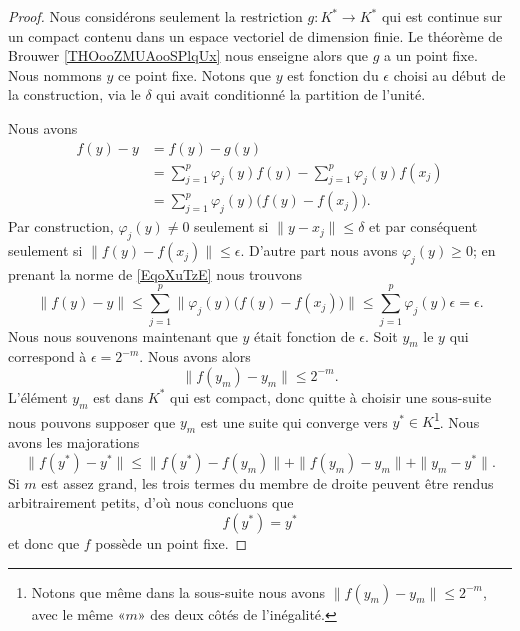 \begin{proof}
	Nous considérons seulement la restriction \( g\colon K^*\to K^*\) qui est continue sur un compact contenu dans un espace vectoriel de dimension finie. Le théorème de Brouwer \ref{THOooZMUAooSPlqUx} nous enseigne alors que \( g\) a un point fixe. Nous nommons \( y\) ce point fixe. Notons que \( y\) est fonction du \( \epsilon\) choisi au début de la construction, via le \( \delta\) qui avait conditionné la partition de l'unité.

	Nous avons
	\begin{subequations}        \label{EqoXuTzE}
		\begin{align}
			f(y)-y & =f(y)-g(y)                                                   \\
			       & =\sum_{j=1}^p\varphi_j(y)f(y)-\sum_{j=1}^p\varphi_j(y)f(x_j) \\
			       & =\sum_{j=1}^p\varphi_j(y)\big( f(y)-f(x_j) \big).
		\end{align}
	\end{subequations}
	Par construction, \( \varphi_j(y)\neq 0\) seulement si \( \| y-x_j \|\leq \delta\) et par conséquent seulement si \( \| f(y)-f(x_j) \|\leq \epsilon\). D'autre part nous avons \( \varphi_j(y)\geq 0\); en prenant la norme de \eqref{EqoXuTzE} nous trouvons
	\begin{equation}
		\| f(y)-y \|\leq \sum_{j=1}^p\| \varphi_j(y)\big( f(y)-f(x_j) \big) \|\leq \sum_{j=1}^p\varphi_j(y)\epsilon=\epsilon.
	\end{equation}
	Nous nous souvenons maintenant que \( y\) était fonction de \( \epsilon\). Soit \( y_m\) le \( y\) qui correspond à \( \epsilon=2^{-m}\). Nous avons alors
	\begin{equation}
		\| f(y_m)-y_m \|\leq 2^{-m}.
	\end{equation}
	L'élément \( y_m\) est dans \( K^*\) qui est compact, donc quitte à choisir une sous-suite nous pouvons supposer que \( y_m\) est une suite qui converge vers \( y^*\in K\)\footnote{Notons que même dans la sous-suite nous avons \( \| f(y_m)-y_m \|\leq 2^{-m}\), avec le même «\( m\)» des deux côtés de l'inégalité.}. Nous avons les majorations
	\begin{equation}
		\| f(y^*)-y^* \|\leq \| f(y^*)-f(y_m) \|+\| f(y_m)-y_m \|+\| y_m-y^* \|.
	\end{equation}
	Si \( m\) est assez grand, les trois termes du membre de droite peuvent être rendus arbitrairement petits, d'où nous concluons que
	\begin{equation}
		f(y^*)=y^*
	\end{equation}
	et donc que \( f\) possède un point fixe.
\end{proof}

